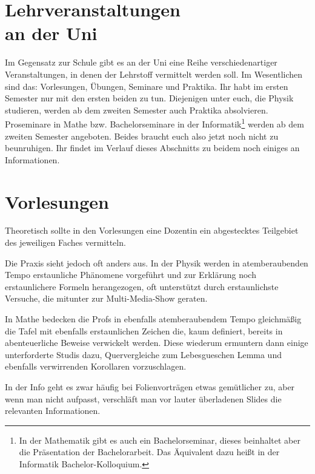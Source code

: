 \section[Lehrveranstaltungen an der Uni]{Lehrveranstaltungen \\an der Uni}

\begin{figure*}[b]
\end{figure*}

Im Gegensatz zur Schule gibt es an der Uni eine Reihe verschiedenartiger Veranstaltungen, in denen der Lehrstoff vermittelt werden soll. Im Wesentlichen sind das: Vorlesungen, Übungen, Seminare und Praktika. Ihr habt im ersten Semester nur mit den ersten beiden zu tun. Diejenigen unter euch, die Physik studieren, werden ab dem zweiten Semester auch Praktika absolvieren. Proseminare in Mathe bzw. Bachelorseminare in der Informatik\footnote{In der Mathematik gibt es auch ein Bachelorseminar, dieses beinhaltet aber die Präsentation der Bachelorarbeit. Das Äquivalent dazu heißt in der Informatik Bachelor-Kolloquium.} werden ab dem zweiten Semester angeboten. Beides braucht euch also jetzt noch nicht zu beunruhigen. Ihr findet im Verlauf dieses Abschnitts zu beidem noch einiges an Informationen.

\section{Vorlesungen}

Theoretisch sollte in den Vorlesungen eine Dozentin ein abgestecktes Teilgebiet des jeweiligen Faches vermitteln.

Die Praxis sieht jedoch oft anders aus. In der Physik werden in atemberaubenden Tempo erstaunliche Phänomene vorgeführt und zur Erklärung noch erstaunlichere Formeln herangezogen, oft unterstützt durch erstaunlichste Versuche, die mitunter zur Multi-Media-Show geraten.

In Mathe bedecken die Profs in ebenfalls atemberaubendem Tempo gleichmäßig die Tafel mit ebenfalls erstaunlichen Zeichen die, kaum definiert, bereits in abenteuerliche Beweise verwickelt werden. Diese wiederum ermuntern dann einige unterforderte Studis dazu, Quervergleiche zum Lebesgueschen Lemma und ebenfalls verwirrenden Korollaren vorzuschlagen.

In der Info geht es zwar häufig bei Folienvorträgen etwas gemütlicher zu, aber wenn man nicht aufpasst, verschläft man vor lauter überladenen Slides die relevanten Informationen.

